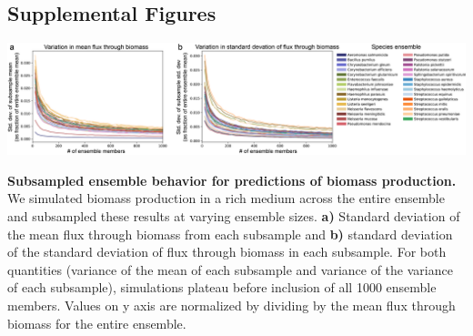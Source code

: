 \documentclass[11pt,twocolumn,notitlepage,openany,twoside]{book}
\begin{document}
\begin{refsection}
\printbibliography[heading=none]

\section{Supplemental Figures}

\begin{suppfigure*}
\centering
\includegraphics[width=\textwidth]{ch3_figS1}
\caption[ Subsampled ensemble behavior for predictions of biomass production.]{\textbf{ Subsampled ensemble behavior for predictions of biomass production.} We simulated biomass production in a rich medium across the entire ensemble and subsampled these results at varying ensemble sizes. \textbf{a)} Standard deviation of the mean flux through biomass from each subsample and \textbf{b)} standard deviation of the standard deviation of flux through biomass in each subsample. For both quantities (variance of the mean of each subsample and variance of the variance of each subsample), simulations plateau before inclusion of all 1000 ensemble members. Values on y axis are normalized by dividing by the mean flux through biomass for the entire ensemble.}
\end{suppfigure*}

\end{refsection}

\end{document}
